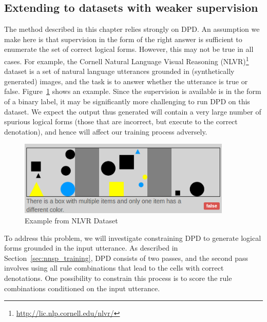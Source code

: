 \subsection{Extending to datasets with weaker supervision}
The method described in this chapter relies strongly on DPD. An assumption we make here is that supervision in the 
form of the right answer is sufficient to enumerate the set of correct logical forms. However, this may not be true in all cases. For example, the Cornell
Natural Language Visual Reasoning (NLVR)\footnote{\url{http://lic.nlp.cornell.edu/nlvr/}} \citep{suhr2017corpus} dataset is a set of natural language utterances grounded in (synthetically generated) images,
and the task is to answer whether the utterance is true or false. Figure~\ref{fig:nnsp_nlvr_example} shows an example. Since the supervision is available is
in the form of a binary label, it may be significantly more challenging to run DPD on this dataset. We expect the output thus generated will contain a very large number
of spurious logical forms (those that are incorrect, but execute to the correct denotation), and hence will affect our training process adversely.
\begin{figure}
  \begin{center}
  \includegraphics[width=4in]{figures/nlvr_example.png}
  \caption{Example from NLVR Dataset}
  \label{fig:nnsp_nlvr_example}
  \end{center}
\end{figure}

To address this problem, we will investigate constraining DPD to generate logical forms grounded in the input utterance. As described in
Section~\ref{sec:nnsp_training}, DPD consists of two passes, and the second pass involves using all rule combinations that lead to the
cells with correct denotations. One possibility to constrain this process is to score the rule combinations conditioned on the input
utterance.
